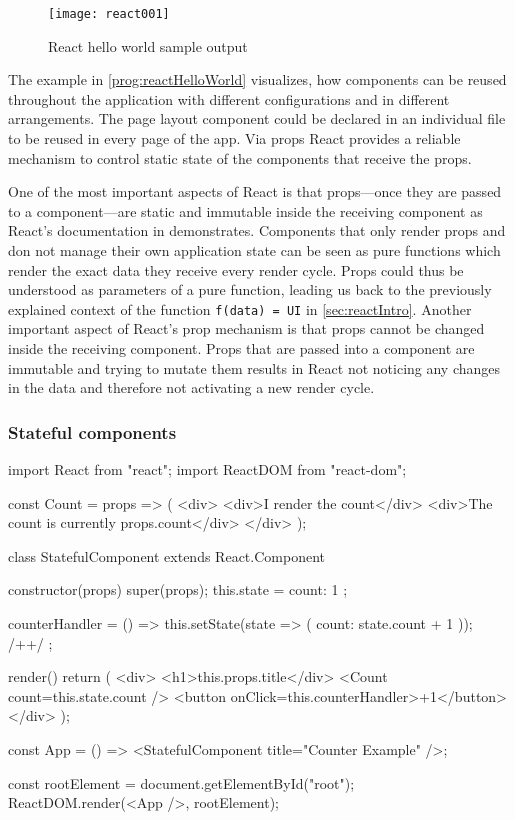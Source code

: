 \begin{figure}
  \centering
  \texttt{[image: react001]}
  \caption{React hello world sample output}
  \label{fig:reactHelloWorld}
\end{figure}

The example in \ref{prog:reactHelloWorld} visualizes, how components can be reused throughout the application with different configurations and in different arrangements. The page layout component could be declared in an individual file to be reused in every page of the app. Via props React provides a reliable mechanism to control static state of the components that receive the props.

One of the most important aspects of React is that props---once they are passed to a component---are static and immutable inside the receiving component as React's documentation in \cite[/docs/components-and-props.html\#props-are-read-only]{React} demonstrates. Components that only render props and don not manage their own application state can be seen as pure functions which render the exact data they receive every render cycle. Props could thus be understood as parameters of a pure function, leading us back to the previously explained context of the function \texttt{f(data) = UI} in \ref{sec:reactIntro}. Another important aspect of React's prop mechanism is that props cannot be changed inside the receiving component. Props that are passed into a component are immutable and trying to mutate them results in React not noticing any changes in the data and therefore not activating a new render cycle.

\subsubsection{Stateful components}

\begin{program}
\caption{Simple example of a React component and its usage} 
\label{prog:reactStateful}
\begin{JsCode}
import React from "react";
import ReactDOM from "react-dom";

const Count = props => (
  <div>
    <div>I render the count</div>
    <div>The count is currently {props.count}</div>
  </div>
);

class StatefulComponent extends React.Component {
  constructor(props) {
    super(props);
    this.state = {
      count: 1
    };
  }

  counterHandler = () => {
    this.setState(state => ({ count: state.count + 1 })); /+\label{line:setState}+/
  };

  render() {
    return (
      <div>
        <h1>{this.props.title}</div>
        <Count count={this.state.count} />
        <button onClick={this.counterHandler}>+1</button>
      </div>
    );
  }
}

const App = () => <StatefulComponent title={"Counter Example"} />;

const rootElement = document.getElementById("root");
ReactDOM.render(<App />, rootElement);
\end{JsCode}
\end{program}

